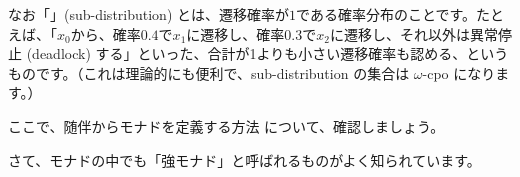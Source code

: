\documentclass[
		head_space=20mm,
		foot_space=20mm,
		gutter=10mm,
		line_length=190mm
]{jlreq}
\begin{document}
\noindent なお「」(sub-distribution) とは、遷移確率が$1$である確率分布のことです。たとえば、「$x_0$から、確率$0.4$で$x_1$に遷移し、確率$0.3$で$x_2$に遷移し、それ以外は異常停止 (deadlock) する」といった、合計が1よりも小さい遷移確率も認める、というものです。（これは理論的にも便利で、sub-distribution の集合は $\omega$-cpo になります。）%

\clearpage

ここで、随伴からモナドを定義する方法
について、確認しましょう。


\clearpage

さて、モナドの中でも「強モナド」と呼ばれるものがよく知られています。%


\end{document}
